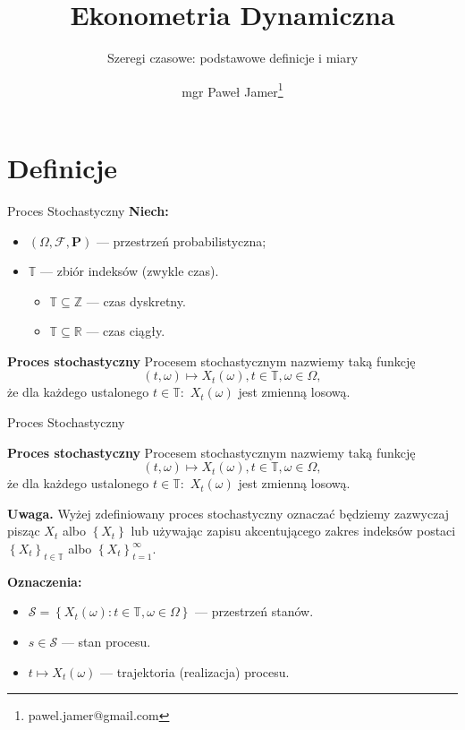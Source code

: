 \documentclass[a4paper, 11pt]{beamer}
\title{Ekonometria Dynamiczna}
\subtitle{Szeregi czasowe: podstawowe definicje i miary}
\author{mgr Paweł Jamer\thanks{pawel.jamer@gmail.com}}
\begin{document}
	\begin{frame}
		\titlepage
	\end{frame}
	
	\section{Definicje}

	\begin{frame}{Proces Stochastyczny}
		\textbf{Niech:}
		\begin{itemize}
			\item $\left(\Omega, \mathcal{F}, \boldsymbol{P}\right)$ --- przestrzeń probabilistyczna;
			\item $\mathbb{T}$ --- zbiór indeksów (zwykle czas).
			\begin{itemize}
				\item $\mathbb{T} \subseteq \mathbb{Z}$ --- czas dyskretny.
				\item $\mathbb{T} \subseteq \mathbb{R}$ --- czas ciągły.
			\end{itemize}
		\end{itemize}
		
		\begin{block}{\textbf{Proces stochastyczny}}
			Procesem stochastycznym nazwiemy taką funkcję \[
				\left(t,\omega\right) \mapsto X_t\left(\omega\right), t \in \mathbb{T}, \omega \in \Omega,
			\]
			że dla każdego ustalonego $t\in\mathbb{T}:$ $X_t\left(\omega\right)$ jest zmienną losową.
		\end{block}
	\end{frame}
	
	\begin{frame}{Proces Stochastyczny}
		\begin{block}{\textbf{Proces stochastyczny}}
			Procesem stochastycznym nazwiemy taką funkcję \[
				\left(t,\omega\right) \mapsto X_t\left(\omega\right), t \in \mathbb{T}, \omega \in \Omega,
			\]
			że dla każdego ustalonego $t\in\mathbb{T}:$ $X_t\left(\omega\right)$ jest zmienną losową.
		\end{block}
		
		\begin{alert}{\textbf{Uwaga.}}
			Wyżej zdefiniowany proces stochastyczny oznaczać będziemy zazwyczaj pisząc $X_t$ albo $\left\{X_t\right\}$ lub używając zapisu
			akcentującego zakres indeksów postaci $\left\{X_t\right\}_{t\in\mathbb{T}}$ albo $\left\{X_t\right\}_{t=1}^{\infty}.$
		\end{alert}
		
		\textbf{Oznaczenia:}
		\begin{itemize}
			\item $\mathcal{S}=\left\{X_t\left(\omega\right): t\in\mathbb{T}, \omega\in\Omega\right\}$ --- przestrzeń stanów.
			\item $s\in\mathcal{S}$ --- stan procesu.
			\item $t \mapsto X_t\left(\omega\right)$ --- trajektoria (realizacja) procesu.
		\end{itemize}
	\end{frame}
	
\end{document}
